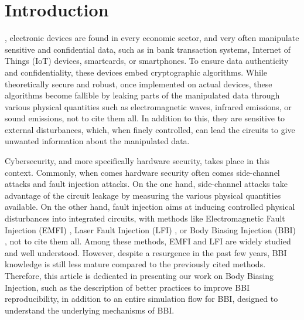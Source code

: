 
\section{Introduction}

	, electronic devices are found in every economic sector, and very often manipulate sensitive and confidential data, such as in bank transaction systems, Internet of Things (IoT) devices, smartcards, or smartphones.
	To ensure data authenticity and confidentiality, these devices embed cryptographic algorithms.
	While theoretically secure and robust, once implemented on actual devices, these algorithms become fallible by leaking parts of the manipulated data through various physical quantities such as electromagnetic waves, infrared emissions, or sound emissions, not to cite them all.
	In addition to this, they are sensitive to external disturbances, which, when finely controlled, can lead the circuits to give unwanted information about the manipulated data.

	Cybersecurity, and more specifically hardware security, takes place in this context.
	Commonly, when comes hardware security often comes side-channel attacks and fault injection attacks.
	On the one hand, side-channel attacks take advantage of the circuit leakage by measuring the various physical quantities available.
	On the other hand, fault injection aims at inducing controlled physical disturbances into integrated circuits, with methods like Electromagnetic Fault Injection (EMFI) \cite{mathieuEMFIFirst, mathieuEMFI}, Laser Fault Injection (LFI) \cite{lfiFaultModel}, or Body Biasing Injection (BBI) \cite{bbiOrigin}, not to cite them all.
	Among these methods, EMFI and LFI are widely studied and well understood.
	However, despite a resurgence in the past few years, BBI knowledge is still less mature compared to the previously cited methods.
	Therefore, this article is dedicated in presenting our work on Body Biasing Injection, such as the description of better practices to improve BBI reproducibility, in addition to an entire simulation flow for BBI, designed to understand the underlying mechanisms of BBI.

